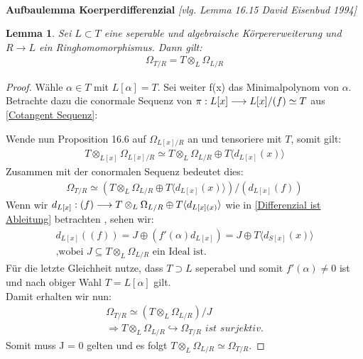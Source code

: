 \documentclass[10pt,a4paper]{report}
\newcommand{\ModulsOfDifferenzials}{David Eisenbud 1994}
\newcounter{Aussage}[chapter]
\newtheorem{lemma}[Aussage]{Lemma}
\newcommand{\functionfront}[3]{\nolinebreak{#1:#2 \longrightarrow #3}}
\newcommand{\divR}[2]{\Omega_{#1/#2}}
\newcommand{\divf}[1]{d_{#1}}
\newcommand{\Tensor}[3]{#1 \otimes_{#2} #3}
\newcommand{\tensor}[3]{#1 \otimes #3}
\newcommand{\Verz}[1]{\langle #1 \rangle}
\begin{document}
\ \\
\textbf{Aufbaulemma Koerperdifferenzial} \textit{[vlg. Lemma 16.15 \ModulsOfDifferenzials]}
\begin{lemma}\label{Aufbaulemma Koerperdifferenzial}
Sei $L \subset T$ eine seperable und algebraische Körpererweiterung und $R \longrightarrow L$ ein Ringhomomorphismus. Dann gilt:
\begin{gather*}
\divR{T}{R} = \Tensor{T}{L}{\divR{L}{R}}
\end{gather*}
\end{lemma}
\begin{proof}
Wähle $\alpha \in T$ mit $L[\alpha] = T$. Sei weiter f(x) das Minimalpolynom von $\alpha$. Betrachte dazu die conormale Sequenz von  $\functionfront{\pi}{L[x]}{L[x]/(f) \simeq T}$ aus \cref{Cotangent Sequenz}:
\begin{center}
\end{center}
Wende nun Proposition 16.6 auf $\divR{L[x]}{R}$ an und tensoriere mit $T$, somit gilt:
\begin{gather*}
\Tensor{T}{L[x]}{\divR{L[x]}{R}} \simeq \Tensor{T}{L}{\divR{L}{R}} \oplus T\langle \divf{L[x]}(x) \rangle
\end{gather*}
Zusammen mit der conormalen Sequenz bedeutet dies:
\begin{gather*}
\divR{T}{R} \simeq (\Tensor{T}{L}{\divR{L}{R}} \oplus T \Verz{\divf{L[x]}(x)})/(\divf{L[x]}(f))
\end{gather*}
Wenn wir $\functionfront{\divf{L[x]}}{(f)}{\Tensor{T}{L}{\divR{L}{R}} \oplus T \Verz{\divf{L[x](x)}}}$ wie in \cref{Differenzial ist Ableitung} betrachten , sehen wir:
\begin{gather*}
\divf{L[x]}((f)) = J \oplus (f'(\alpha)\divf{L[x]}) = J \oplus T \Verz{\divf{S[x]}(x)}\\
\text{,wobei $J \subseteq \Tensor{T}{L}{\divR{L}{R}}$ ein Ideal ist.}
\end{gather*}
Für die letzte Gleichheit nutze, dass $T \supset L$ seperabel und somit $f'(\alpha) \neq 0$ ist und nach obiger Wahl $T = L[\alpha]$ gilt.\\
Damit erhalten wir nun:
\begin{gather*}
\divR{T}{R} \simeq (\Tensor{T}{L}{\divR{L}{R}})/J \\
\Rightarrow \Tensor{T}{L}{\divR{L}{R}} \hookrightarrow \divR{T}{R} \textit{ ist surjektiv.}
\end{gather*}
Somit muss J = 0 gelten und es folgt $\Tensor{T}{L}{\divR{L}{R}} \simeq \divR{T}{R}$.
\end{proof}
\end{document}
